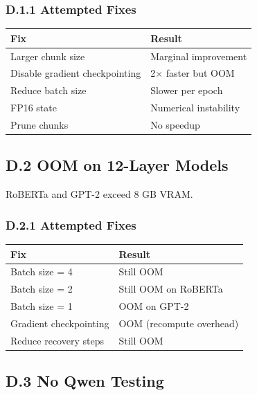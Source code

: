 \subsubsection{D.1.1 Attempted Fixes}

\begin{table}[H]
\centering
\small
\begin{tabular}{ll}
\toprule
\textbf{Fix} & \textbf{Result} \\
\midrule
Larger chunk size & Marginal improvement \\
Disable gradient checkpointing & 2$\times$ faster but OOM \\
Reduce batch size & Slower per epoch \\
FP16 state & Numerical instability \\
Prune chunks & No speedup \\
\bottomrule
\end{tabular}
\end{table}

\subsection{D.2 OOM on 12-Layer Models}

RoBERTa and GPT-2 exceed 8 GB VRAM.

\subsubsection{D.2.1 Attempted Fixes}

\begin{table}[H]
\centering
\small
\begin{tabular}{ll}
\toprule
\textbf{Fix} & \textbf{Result} \\
\midrule
Batch size = 4 & Still OOM \\
Batch size = 2 & Still OOM on RoBERTa \\
Batch size = 1 & OOM on GPT-2 \\
Gradient checkpointing & OOM (recompute overhead) \\
Reduce recovery steps & Still OOM \\
\bottomrule
\end{tabular}
\end{table}

\subsection{D.3 No Qwen Testing}

